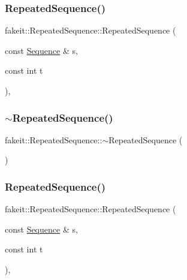 \subsubsection{\texorpdfstring{RepeatedSequence()}{RepeatedSequence()}\hspace{0.1cm}{\footnotesize\ttfamily [2/9]}}
{\footnotesize\ttfamily fakeit\+::\+Repeated\+Sequence\+::\+Repeated\+Sequence (\begin{DoxyParamCaption}\item[{const \mbox{\hyperlink{classfakeit_1_1Sequence}{Sequence}} \&}]{s,  }\item[{const int}]{t }\end{DoxyParamCaption})\hspace{0.3cm}{\ttfamily [inline]}, {\ttfamily [protected]}}

\mbox{\label{classfakeit_1_1RepeatedSequence_aa45714780e496cf02e8e35f27de5b617}} 
\subsubsection{\texorpdfstring{$\sim$RepeatedSequence()}{~RepeatedSequence()}\hspace{0.1cm}{\footnotesize\ttfamily [2/9]}}
{\footnotesize\ttfamily fakeit\+::\+Repeated\+Sequence\+::$\sim$\+Repeated\+Sequence (\begin{DoxyParamCaption}{ }\end{DoxyParamCaption})\hspace{0.3cm}{\ttfamily [inline]}}

\mbox{\label{classfakeit_1_1RepeatedSequence_ac83fde9f96aa63322c82ffd44ff33a75}} 
\subsubsection{\texorpdfstring{RepeatedSequence()}{RepeatedSequence()}\hspace{0.1cm}{\footnotesize\ttfamily [3/9]}}
{\footnotesize\ttfamily fakeit\+::\+Repeated\+Sequence\+::\+Repeated\+Sequence (\begin{DoxyParamCaption}\item[{const \mbox{\hyperlink{classfakeit_1_1Sequence}{Sequence}} \&}]{s,  }\item[{const int}]{t }\end{DoxyParamCaption})\hspace{0.3cm}{\ttfamily [inline]}, {\ttfamily [protected]}}

